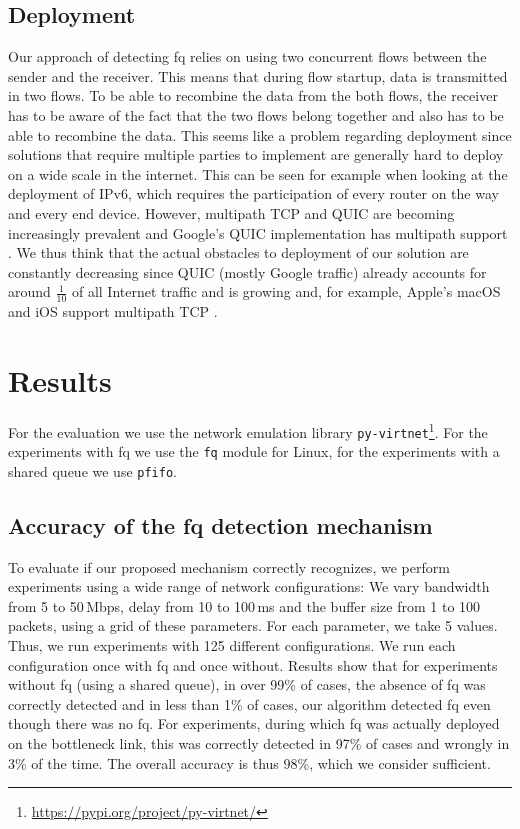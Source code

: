 \documentclass[runningheads]{llncs}
\begin{document}
\subsection{Deployment}

Our approach of detecting \gls{fq} relies on using two concurrent flows between the sender and the receiver. This means that during flow startup, data is transmitted in two flows. To be able to recombine the data from the both flows, the receiver has to be aware of the fact that the two flows belong together and also has to be able to recombine the data. This seems like a problem regarding deployment since solutions that require multiple parties to implement are generally hard to deploy on a wide scale in the internet. This can be seen for example when looking at the deployment of IPv6, which requires the participation of every router on the way and every end device. However, multipath TCP \cite{handley_tcp_2012} and QUIC are becoming increasingly prevalent and Google's QUIC implementation has multipath support \cite{google_quiche_2020}. We thus think that the actual obstacles to deployment of our solution are constantly decreasing since QUIC (mostly Google traffic) already accounts for around $\frac{1}{10}$ of all Internet traffic \cite{ruth_first_2018} and is growing and, for example, Apple's macOS and iOS support multipath TCP \cite{apple_about_2018}. 

\section{Results}

For the evaluation we use the network emulation library \texttt{py-virtnet}\footnote{\url{https://pypi.org/project/py-virtnet/}}. For the experiments with \gls{fq} we use the \texttt{fq} module for Linux, for the experiments with a shared queue we use \texttt{pfifo}. 

\subsection{Accuracy of the \gls{fq} detection mechanism}

To evaluate if our proposed mechanism correctly recognizes, we perform experiments using a wide range of network configurations: We vary bandwidth from 5 to 50\,Mbps, delay from 10 to 100\,ms and the buffer size from 1 to 100 packets, using a grid of these parameters. For each parameter, we take 5 values. Thus, we run experiments with 125 different configurations. We run each configuration once with \gls{fq} and once without. Results show that for experiments without \gls{fq} (using a shared queue), in over 99\% of cases, the absence of \gls{fq} was correctly detected and in less than 1\% of cases, our algorithm detected \gls{fq} even though there was no \gls{fq}. For experiments, during which \gls{fq} was actually deployed on the bottleneck link, this was correctly detected in 97\% of cases and wrongly in 3\% of the time. The overall accuracy is thus 98\%, which we consider sufficient. 
\end{document}
